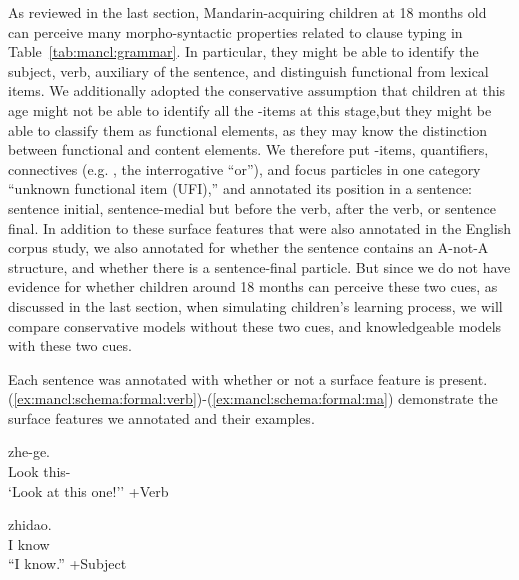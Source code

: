 As reviewed in the last section, Mandarin-acquiring children at 18 months old can perceive many morpho-syntactic properties related to clause typing in Table~\ref{tab:mancl:grammar}. In particular, they might be able to identify the subject, verb, auxiliary of the sentence, and distinguish functional from lexical items. We additionally adopted the conservative assumption that children at this age might not be able to identify all the \twh-items at this stage,but they might be able to classify them as functional elements, as they may know the distinction between functional and content elements. We therefore put \twh-items, quantifiers, connectives (e.g. , the interrogative ``or''), and focus particles in one category ``unknown functional item (UFI),'' and annotated its position in a sentence: sentence initial, sentence-medial but before the verb, after the verb, or sentence final. In addition to these surface features that were also annotated in the English corpus study, we also annotated for whether the sentence contains an A-not-A structure, and whether there is a sentence-final  particle. But since we do not have evidence for whether children around 18 months can perceive these two cues, as discussed in the last section, when simulating children's learning process, we will compare conservative models without these two cues, and knowledgeable models with these two cues.


Each sentence was annotated with whether or not a surface feature is present. (\ref{ex:mancl:schema:formal:verb})-(\ref{ex:mancl:schema:formal:ma}) demonstrate the surface features we annotated and their examples.  


\begin{exe} \label{ex:mancl:schema:formal:verb}
\ex 
\gll {} zhe-ge.\\
Look this-\Cl{}\\
\trans `Look at this one!'' \hfill +Verb
\end{exe}

\gll {} zhidao.\\
I know\\
\trans ``I know.'' \hfill +Subject
\eex

